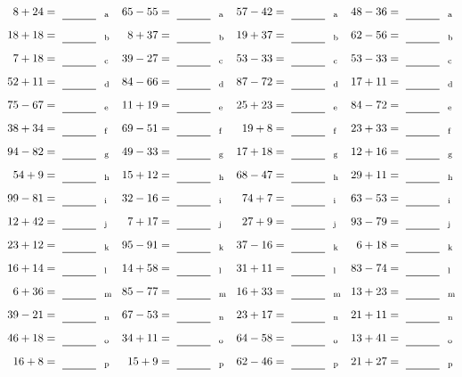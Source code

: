 \documentclass
[
  draft    = true,
  fontsize = 11pt,
  parskip  = half-
]
{scrartcl}
\begin{document}
\clearpage
\begin{align*}
    \pline{8+24}&=\rline{a}
  & \pline{65-55}&=\rline{a}
  & \pline{57-42}&=\rline{a}
  & \pline{48-36}&=\rline{a} \\[1ex]
    \pline{18+18}&=\rline{b}
  & \pline{8+37}&=\rline{b}
  & \pline{19+37}&=\rline{b}
  & \pline{62-56}&=\rline{b} \\[1ex]
    \pline{7+18}&=\rline{c}
  & \pline{39-27}&=\rline{c}
  & \pline{53-33}&=\rline{c}
  & \pline{53-33}&=\rline{c} \\[1ex]
    \pline{52+11}&=\rline{d}
  & \pline{84-66}&=\rline{d}
  & \pline{87-72}&=\rline{d}
  & \pline{17+11}&=\rline{d} \\[1ex]
    \pline{75-67}&=\rline{e}
  & \pline{11+19}&=\rline{e}
  & \pline{25+23}&=\rline{e}
  & \pline{84-72}&=\rline{e} \\[1ex]
    \pline{38+34}&=\rline{f}
  & \pline{69-51}&=\rline{f}
  & \pline{19+8}&=\rline{f}
  & \pline{23+33}&=\rline{f} \\[1ex]
    \pline{94-82}&=\rline{g}
  & \pline{49-33}&=\rline{g}
  & \pline{17+18}&=\rline{g}
  & \pline{12+16}&=\rline{g} \\[1ex]
    \pline{54+9}&=\rline{h}
  & \pline{15+12}&=\rline{h}
  & \pline{68-47}&=\rline{h}
  & \pline{29+11}&=\rline{h} \\[1ex]
    \pline{99-81}&=\rline{i}
  & \pline{32-16}&=\rline{i}
  & \pline{74+7}&=\rline{i}
  & \pline{63-53}&=\rline{i} \\[1ex]
    \pline{12+42}&=\rline{j}
  & \pline{7+17}&=\rline{j}
  & \pline{27+9}&=\rline{j}
  & \pline{93-79}&=\rline{j} \\[1ex]
    \pline{23+12}&=\rline{k}
  & \pline{95-91}&=\rline{k}
  & \pline{37-16}&=\rline{k}
  & \pline{6+18}&=\rline{k} \\[1ex]
    \pline{16+14}&=\rline{l}
  & \pline{14+58}&=\rline{l}
  & \pline{31+11}&=\rline{l}
  & \pline{83-74}&=\rline{l} \\[1ex]
    \pline{6+36}&=\rline{m}
  & \pline{85-77}&=\rline{m}
  & \pline{16+33}&=\rline{m}
  & \pline{13+23}&=\rline{m} \\[1ex]
    \pline{39-21}&=\rline{n}
  & \pline{67-53}&=\rline{n}
  & \pline{23+17}&=\rline{n}
  & \pline{21+11}&=\rline{n} \\[1ex]
    \pline{46+18}&=\rline{o}
  & \pline{34+11}&=\rline{o}
  & \pline{64-58}&=\rline{o}
  & \pline{13+41}&=\rline{o} \\[1ex]
    \pline{16+8}&=\rline{p}
  & \pline{15+9}&=\rline{p}
  & \pline{62-46}&=\rline{p}
  & \pline{21+27}&=\rline{p}
\end{align*}
\end{document}
